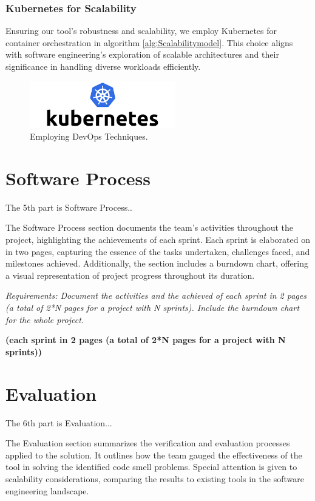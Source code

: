 \documentclass[journal]{IEEEtran}
\begin{document}
\subsubsection{Kubernetes for Scalability}

Ensuring our tool's robustness and scalability, we employ Kubernetes for container orchestration in algorithm \ref{alg:Scalabilitymodel}. This choice aligns with software engineering's exploration of scalable architectures and their significance in handling diverse workloads efficiently.

\begin{figure}[!t]
\centering
\includegraphics[width=2.5in]{figures/k8slogo.png}
\caption{Employing DevOps Techniques.}
\label{fig:k8slogo}
\end{figure}


\section{Software Process}
\noindent The 5th part is Software Process..

The Software Process section documents the team's activities throughout the project, highlighting the achievements of each sprint. Each sprint is elaborated on in two pages, capturing the essence of the tasks undertaken, challenges faced, and milestones achieved. Additionally, the section includes a burndown chart, offering a visual representation of project progress throughout its duration.


\textit{Requirements: Document the activities and the achieved of each sprint in 2 pages (a total of 2*N pages for a project with N sprints). Include the burndown chart for the whole project.}



\textbf{(each sprint in 2 pages (a total of 2*N pages for a project with N sprints))}

\section{Evaluation}
\noindent The 6th part is Evaluation...


The Evaluation section summarizes the verification and evaluation processes applied to the solution. It outlines how the team gauged the effectiveness of the tool in solving the identified code smell problems. Special attention is given to scalability considerations, comparing the results to existing tools in the software engineering landscape.
\end{document}
